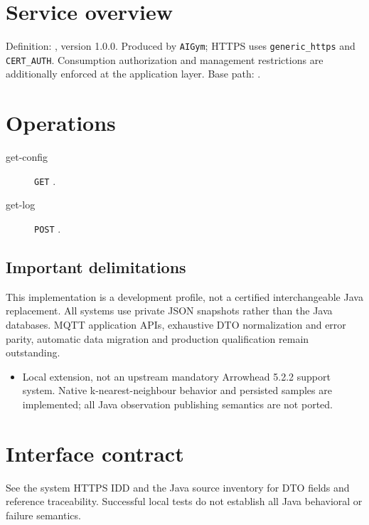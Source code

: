 \documentclass[a4paper]{arrowhead}
\begin{document}
\ArrowheadSetup
\section{Service overview}
Definition: , version 1.0.0. Produced by \texttt{AIGym}; HTTPS uses \texttt{generic\_https} and \texttt{CERT\_AUTH}. Consumption authorization and management restrictions are additionally enforced at the application layer. Base path: .
\section{Operations}
\begin{description}
\item[get-config] \texttt{GET} .
\item[get-log] \texttt{POST} .
\end{description}
\subsection{Important delimitations}
This implementation is a development profile, not a certified interchangeable Java replacement. All systems use private JSON snapshots rather than the Java databases. MQTT application APIs, exhaustive DTO normalization and error parity, automatic data migration and production qualification remain outstanding.
\begin{itemize}
\item Local extension, not an upstream mandatory Arrowhead 5.2.2 support system. Native k-nearest-neighbour behavior and persisted samples are implemented; all Java observation publishing semantics are not ported.
\end{itemize}
\section{Interface contract}
See the system HTTPS IDD and the Java source inventory for DTO fields and reference traceability. Successful local tests do not establish all Java behavioral or failure semantics.
\end{document}
